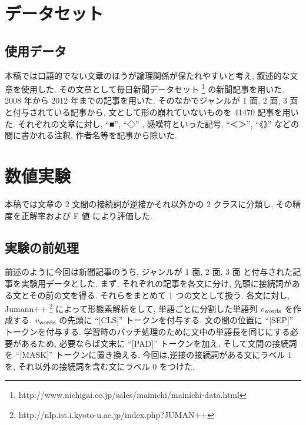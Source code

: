\documentclass[twocolumn]{jarticle}     %
\begin{document}
\section{データセット}
\subsection{使用データ}
本稿では口語的でない文章のほうが論理関係が保たれやすいと考え, 叙述的な文章を使用した.
その文章として毎日新聞データセット
\footnote{http:\slash\slash{}www.nichigai.co.jp\slash{}sales\slash{}mainichi\slash{}mainichi-data.html}
の新聞記事を用いた.
2008 年から 2012 年までの記事を用いた.
そのなかでジャンルが 1 面, 2 面, 3 面と付与されている記事から, 文として形の崩れていないものを
41470 記事を用いた.
それぞれの文章に対し, ``■'', ``◇'' , 感嘆符といった記号,
``＜＞'', ``《》'' などの間に書かれる注釈, 作者名等を記事から除いた.

\section{数値実験}
本稿では文章の 2 文間の接続詞が逆接かそれ以外かの 2 クラスに分類し, その精度を正解率および F 値 により評価した.
\subsection{実験の前処理}
前述のように今回は新聞記事のうち, ジャンルが 1 面, 2 面, 3 面 と付与された記事を実験用データとした.
まず, それぞれの記事を各文に分け, 先頭に接続詞がある文とその前の文を得る. それらをまとめて 1 つの文として扱う.
各文に対し, Jumann++ \footnote{http:\slash\slash{}nlp.ist.i.kyoto-u.ac.jp\slash{}index.php?JUMAN++}
によって形態素解析をして, 単語ごとに分割した単語列 $v_{\rm words}$ を作成する.
$v_{\rm words}$ の先頭に ``[CLS]'' トークンを付与する. 文の間の位置に ``[SEP]'' トークンを付与する.
学習時のバッチ処理のために文中の単語長を同じにする必要があるため, 必要ならば文末に ``[PAD]'' トークンを加え,
そして文間の接続詞を ``[MASK]'' トークンに置き換える.
今回は,逆接の接続詞がある文にラベル 1 を, それ以外の接続詞を含む文にラベル 0 をつけた.
\end{document}
